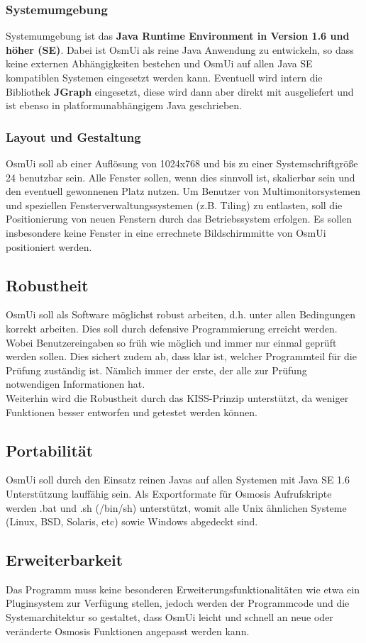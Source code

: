 \documentclass[a4paper,12pt]{scrartcl}
\begin{document}
\subsubsection{Systemumgebung}
Systemumgebung ist das \textbf{Java Runtime Environment in Version 1.6 und höher (SE)}. Dabei ist OsmUi als reine Java Anwendung zu entwickeln, so dass
keine externen Abhängigkeiten bestehen und OsmUi auf allen Java SE kompatiblen Systemen eingesetzt werden kann.
\mbox{Eventuell} wird intern die Bibliothek \textbf{JGraph} eingesetzt, diese wird dann aber direkt mit ausgeliefert
und ist ebenso in platformunabhängigem Java geschrieben. 
\subsubsection{Layout und Gestaltung}
OsmUi soll ab einer Auflösung von 1024x768 und bis zu einer Systemschriftgröße 24 benutzbar sein. Alle Fenster sollen, wenn dies sinnvoll ist, skalierbar sein und den eventuell gewonnenen Platz
nutzen. Um Benutzer von Multimonitorsystemen und speziellen Fensterverwaltungssystemen (z.B. Tiling) zu entlasten, soll die Positionierung von neuen Fenstern durch das Betriebssystem erfolgen. Es
sollen insbesondere keine Fenster in eine errechnete Bildschirmmitte von OsmUi positioniert werden.
\subsection{Robustheit}
OsmUi soll als Software möglichst robust arbeiten, d.h. unter allen Bedingungen korrekt arbeiten. Dies soll durch defensive Programmierung erreicht werden.
Wobei Benutzereingaben so früh wie möglich und immer nur einmal geprüft werden sollen. Dies sichert zudem ab, dass klar ist, welcher
Programmteil für die Prüfung zuständig ist. Nämlich immer der erste, der alle zur Prüfung notwendigen Informationen hat.\\
Weiterhin wird die Robustheit durch das KISS-Prinzip unterstützt, da weniger Funktionen besser entworfen und getestet werden können.
\subsection{Portabilität}
OsmUi soll durch den Einsatz reinen Javas auf allen Systemen mit Java SE 1.6 Unterstützung lauffähig sein. Als Exportformate für Osmosis Aufrufskripte
werden .bat und .sh (/bin/sh) unterstützt, womit alle Unix ähnlichen Systeme (Linux, BSD, Solaris, etc) sowie Windows abgedeckt sind.
\subsection{Erweiterbarkeit}
Das Programm muss keine besonderen Erweiterungsfunktionalitäten wie etwa ein Pluginsystem zur Verfügung stellen, jedoch werden der Programmcode und die Systemarchitektur
so gestaltet, dass OsmUi leicht und schnell an neue oder veränderte Osmosis Funktionen angepasst werden kann.
\end{document}
